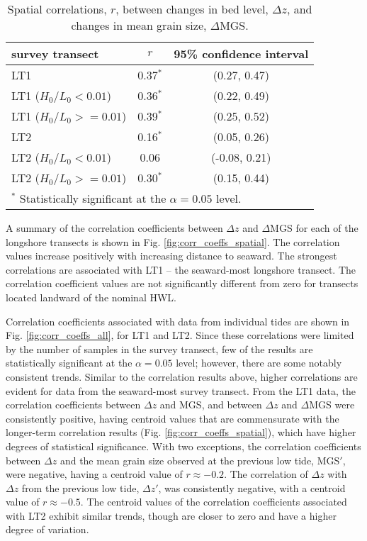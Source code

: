 \begin{table}[tbp!]
	\caption[Spatial correlations between changes in bed level and changes in mean grain size]{Spatial correlations, $r$, between changes in bed level, $\Delta z$, and changes in mean grain size, $\Delta$MGS.} 
	\label{table:spatial_correlations}
	\centering
	\begin{tabular}{lcc}
		\hline
		survey transect & $r$ & 95\% confidence interval\\
		\hline
		LT1 & 0.37$^{*}$ & (0.27, 0.47)\\
		LT1 ($H_0/L_0 < 0.01$) & 0.36$^{*}$ & (0.22, 0.49)\\
		LT1 ($H_0/L_0 >= 0.01$) & 0.39$^{*}$ & (0.25, 0.52)\\
		LT2 & 0.16$^{*}$ & (0.05, 0.26)\\
		LT2 ($H_0/L_0 < 0.01$) & 0.06 & (-0.08, 0.21)\\
		LT2 ($H_0/L_0 >= 0.01$) & 0.30$^{*}$ & (0.15, 0.44)\\
		\hline
		\multicolumn{3}{l}{$^{*}$ Statistically significant at the $\alpha=0.05$ level.}
	\end{tabular}
\end{table}

A summary of the correlation coefficients between $\Delta z$ and $\Delta$MGS for each of the longshore transects is shown in Fig. \ref{fig:corr_coeffs_spatial}. The correlation values increase positively with increasing distance to seaward. The strongest correlations are associated with LT1 -- the seaward-most longshore transect. The correlation coefficient values are not significantly different from zero for transects located landward of the nominal HWL.

Correlation coefficients associated with data from individual tides are shown in Fig. \ref{fig:corr_coeffs_all}, for LT1 and LT2. Since these correlations were limited by the number of samples in the survey transect, few of the results are statistically significant at the $\alpha=0.05$ level; however, there are some notably consistent trends. Similar to the correlation results above, higher correlations are evident for data from the seaward-most survey transect. From the LT1 data, the correlation coefficients between $\Delta z$ and MGS, and between $\Delta z$ and $\Delta$MGS were consistently positive, having centroid values that are commensurate with the longer-term correlation results (Fig. \ref{fig:corr_coeffs_spatial}), which have higher degrees of statistical significance. With two exceptions, the correlation coefficients between $\Delta z$ and the mean grain size observed at the previous low tide, MGS$'$, were negative, having a centroid value of $r\approx -0.2$. The correlation of $\Delta z$ with $\Delta z$ from the previous low tide, $\Delta z'$, was consistently negative, with a centroid value of $r\approx -0.5$. The centroid values of the correlation coefficients associated with LT2 exhibit similar trends, though are closer to zero and have a higher degree of variation. 

